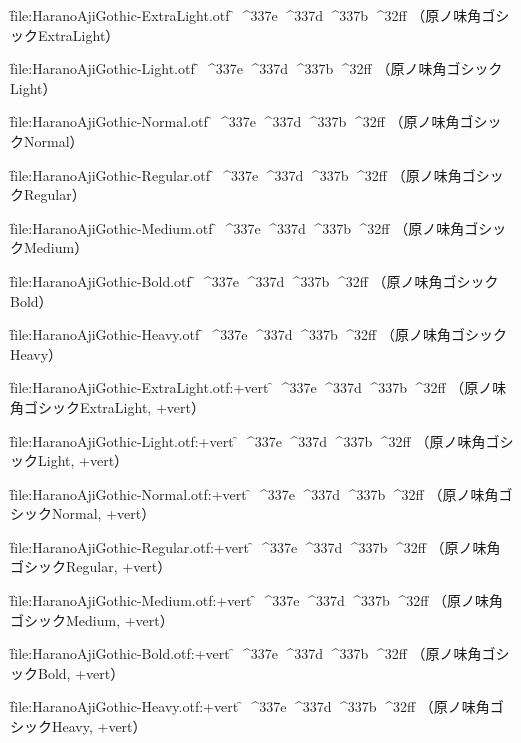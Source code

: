 

\nopagenumbers

\font\f{file:HaranoAjiGothic-ExtraLight.otf} \f
^^^^337e
^^^^337d
^^^^337b
^^^^32ff
（原ノ味角ゴシックExtraLight）\par

\font\f{file:HaranoAjiGothic-Light.otf} \f
^^^^337e
^^^^337d
^^^^337b
^^^^32ff
（原ノ味角ゴシックLight）\par

\font\f{file:HaranoAjiGothic-Normal.otf} \f
^^^^337e
^^^^337d
^^^^337b
^^^^32ff
（原ノ味角ゴシックNormal）\par

\font\f{file:HaranoAjiGothic-Regular.otf} \f
^^^^337e
^^^^337d
^^^^337b
^^^^32ff
（原ノ味角ゴシックRegular）\par

\font\f{file:HaranoAjiGothic-Medium.otf} \f
^^^^337e
^^^^337d
^^^^337b
^^^^32ff
（原ノ味角ゴシックMedium）\par

\font\f{file:HaranoAjiGothic-Bold.otf} \f
^^^^337e
^^^^337d
^^^^337b
^^^^32ff
（原ノ味角ゴシックBold）\par

\font\f{file:HaranoAjiGothic-Heavy.otf} \f
^^^^337e
^^^^337d
^^^^337b
^^^^32ff
（原ノ味角ゴシックHeavy）\par


\font\f{file:HaranoAjiGothic-ExtraLight.otf:+vert} \f
^^^^337e
^^^^337d
^^^^337b
^^^^32ff
（原ノ味角ゴシックExtraLight, +vert）\par

\font\f{file:HaranoAjiGothic-Light.otf:+vert} \f
^^^^337e
^^^^337d
^^^^337b
^^^^32ff
（原ノ味角ゴシックLight, +vert）\par

\font\f{file:HaranoAjiGothic-Normal.otf:+vert} \f
^^^^337e
^^^^337d
^^^^337b
^^^^32ff
（原ノ味角ゴシックNormal, +vert）\par

\font\f{file:HaranoAjiGothic-Regular.otf:+vert} \f
^^^^337e
^^^^337d
^^^^337b
^^^^32ff
（原ノ味角ゴシックRegular, +vert）\par

\font\f{file:HaranoAjiGothic-Medium.otf:+vert} \f
^^^^337e
^^^^337d
^^^^337b
^^^^32ff
（原ノ味角ゴシックMedium, +vert）\par

\font\f{file:HaranoAjiGothic-Bold.otf:+vert} \f
^^^^337e
^^^^337d
^^^^337b
^^^^32ff
（原ノ味角ゴシックBold, +vert）\par

\font\f{file:HaranoAjiGothic-Heavy.otf:+vert} \f
^^^^337e
^^^^337d
^^^^337b
^^^^32ff
（原ノ味角ゴシックHeavy, +vert）\par


